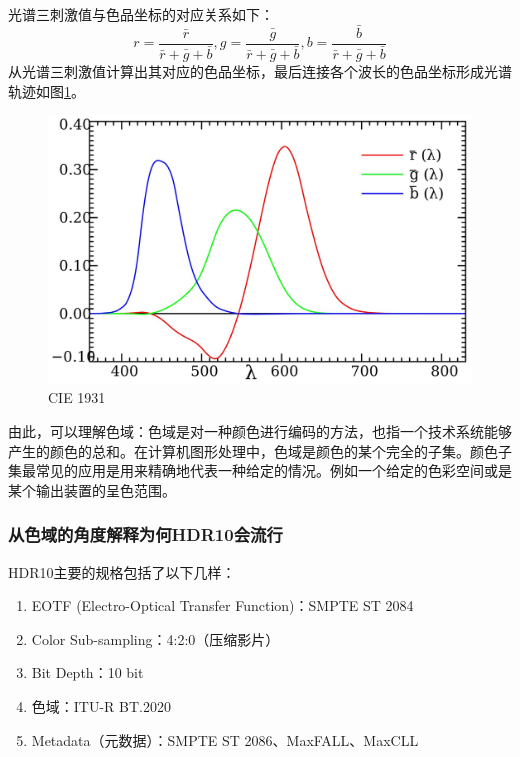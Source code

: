 \documentclass[UTF8,a4paper,AutoFakeBold,AutoFakeSlant]{ctexart}
\begin{document}
光谱三刺激值与色品坐标的对应关系如下：
\begin{equation*}
  r=\frac{\bar{r}}{\bar{r}+\bar{g}+\bar{b}}, g=\frac{\bar{g}}{\bar{r}+\bar{g}+\bar{b}}, b=\frac{\bar{b}}{\bar{r}+\bar{g}+\bar{b}}
\end{equation*}
从光谱三刺激值计算出其对应的色品坐标，最后连接各个波长的色品坐标形成光谱轨迹如图\ref{f:CIE}。

\begin{figure}[H]
  \centering
  \includegraphics[scale=0.2]{color.jpg}
  \caption{CIE 1931}
  \label{f:CIE}
\end{figure}

由此，可以理解色域：色域是对一种颜色进行编码的方法，也指一个技术系统能够产生的颜色的总和。在计算机图形处理中，色域是颜色的某个完全的子集。颜色子集最常见的应用是用来精确地代表一种给定的情况。例如一个给定的色彩空间或是某个输出装置的呈色范围。



\subsubsection{从色域的角度解释为何HDR10会流行}

HDR10主要的规格包括了以下几样：
\begin{enumerate}
  \item EOTF (Electro-Optical Transfer Function)：SMPTE ST 2084
  \item Color Sub-sampling：4:2:0（压缩影片）
  \item Bit Depth：10 bit
  \item 色域：ITU-R BT.2020
  \item Metadata（元数据）：SMPTE ST 2086、MaxFALL、MaxCLL
\end{enumerate}
\end{document}
